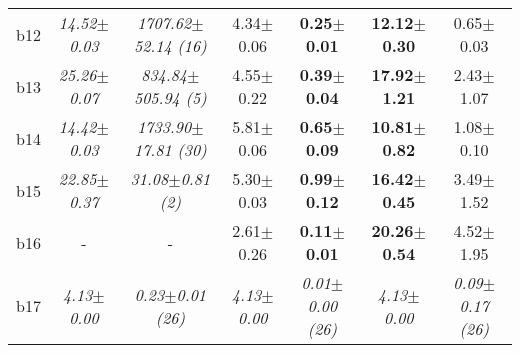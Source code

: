\begin{longtable}{|l|c|c|c|c|c|c|}
\\
b12&\textit{14.52$\pm$0.03} & \textit{1707.62$\pm$52.14 (16)}&4.34$\pm$0.06 & \textbf{0.25$\pm$0.01}&\textbf{12.12$\pm$0.30} & 0.65$\pm$0.03
\\
b13&\textit{25.26$\pm$0.07} & \textit{834.84$\pm$505.94 (5)}&4.55$\pm$0.22 & \textbf{0.39$\pm$0.04}&\textbf{17.92$\pm$1.21} & 2.43$\pm$1.07
\\
b14&\textit{14.42$\pm$0.03} & \textit{1733.90$\pm$17.81 (30)}&5.81$\pm$0.06 & \textbf{0.65$\pm$0.09}&\textbf{10.81$\pm$0.82} & 1.08$\pm$0.10
\\
b15&\textit{22.85$\pm$0.37} & \textit{31.08$\pm$0.81 (2)}&5.30$\pm$0.03 & \textbf{0.99$\pm$0.12}&\textbf{16.42$\pm$0.45} & 3.49$\pm$1.52
\\
b16&- & -&2.61$\pm$0.26 & \textbf{0.11$\pm$0.01}&\textbf{20.26$\pm$0.54} & 4.52$\pm$1.95
\\
b17&\textit{4.13$\pm$0.00} & \textit{0.23$\pm$0.01 (26)}&\textit{4.13$\pm$0.00} & \textit{0.01$\pm$0.00 (26)}&\textit{4.13$\pm$0.00} & \textit{0.09$\pm$0.17 (26)}
\\
\hline
\end{longtable}
